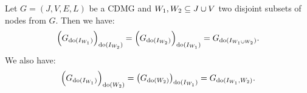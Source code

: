 \documentclass[main]{subfiles}
\begin{document}
\def\rowref{claim\_3\_14}
\label{claim_3_14}
%

\begin{Lem}
    Let $G=(J,V,E,L)$ be a CDMG and $W_1, W_2 \subseteq J \cup V$ two disjoint subsets of nodes from $G$.
      Then we have:
      \[ \left ( G_{\operatorname{do}(I_{W_1})} \right )_{\operatorname{do}(I_{W_2})} = \left ( G_{\operatorname{do}(I_{W_2})} \right )_{\operatorname{do}(I_{W_1})} 
      =  G_{\operatorname{do}(I_{W_1 \cup W_2})}. \]
      We also have:
      \[ \left ( G_{\operatorname{do}(I_{W_1})} \right )_{\operatorname{do}(W_2)} = \left ( G_{\operatorname{do}(W_2)} \right )_{\operatorname{do}(I_{W_1})} =  G_{\operatorname{do}(I_{W_1}, W_2)}. \]
\end{Lem}
\end{document}
